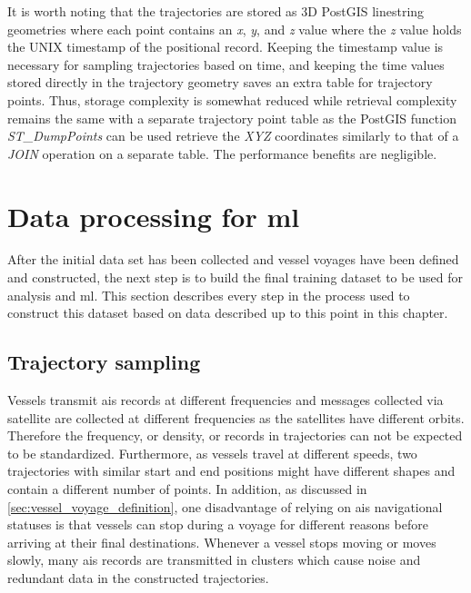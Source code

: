 It is worth noting that the trajectories are stored as 3D PostGIS linestring geometries where each point contains an \textit{x}, \textit{y}, and \textit{z} value where the \textit{z} value holds the UNIX timestamp of the positional record. Keeping the timestamp value is necessary for sampling trajectories based on time, and keeping the time values stored directly in the trajectory geometry saves an extra table for trajectory points. Thus, storage complexity is somewhat reduced while retrieval complexity remains the same with a separate trajectory point table as the PostGIS function \textit{ST\_DumpPoints} can be used retrieve the \textit{XYZ} coordinates similarly to that of a \textit{JOIN} operation on a separate table. The performance benefits are negligible.

\section{Data processing for \acrfull{ml}}

After the initial data set has been collected and vessel voyages have been defined and constructed, the next step is to build the final training dataset to be used for analysis and \acrfull{ml}. This section describes every step in the process used to construct this dataset based on data described up to this point in this chapter.

\subsection{Trajectory sampling}
\label{sec:trajectory_sampling}

Vessels transmit \acrshort{ais} records at different frequencies and messages collected via satellite are collected at different frequencies as the satellites have different orbits. Therefore the frequency, or density, or records in trajectories can not be expected to be standardized. Furthermore, as vessels travel at different speeds, two trajectories with similar start and end positions might have different shapes and contain a different number of points. In addition, as discussed in \cref{sec:vessel_voyage_definition}, one disadvantage of relying on \acrshort{ais} navigational statuses is that vessels can stop during a voyage for different reasons before arriving at their final destinations. Whenever a vessel stops moving or moves slowly, many \acrshort{ais} records are transmitted in clusters which cause noise and redundant data in the constructed trajectories.

